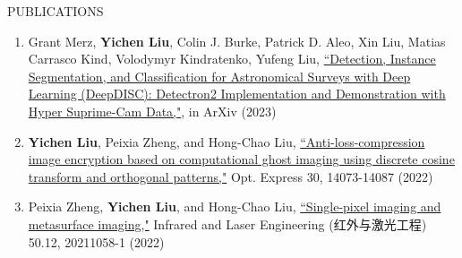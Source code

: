 \documentclass[11pt]{article}
\begin{document}
\begin{section}{PUBLICATIONS}
    
\begin{enumerate}[leftmargin=1.5em]
    \item Grant Merz, \textbf{Yichen Liu}, Colin J. Burke, Patrick D. Aleo, Xin Liu, Matias Carrasco Kind, Volodymyr Kindratenko, Yufeng Liu, \href{https://arxiv.org/abs/2307.05826}{``Detection, Instance Segmentation, and Classification for Astronomical Surveys with Deep Learning (DeepDISC): Detectron2 Implementation and Demonstration with Hyper Suprime-Cam Data,"}, in ArXiv (2023)
    \item \textbf{Yichen Liu}, Peixia Zheng, and Hong-Chao Liu, \href{https://opg.optica.org/oe/fulltext.cfm?uri=oe-30-9-14073&id=471300}{``Anti-loss-compression image encryption based on computational ghost imaging using discrete cosine transform and orthogonal patterns,"} Opt. Express 30, 14073-14087 (2022)
    \item Peixia Zheng, \textbf{Yichen Liu}, and Hong-Chao Liu, \href{http://www.irla.cn/cn/article/doi/10.3788/IRLA20211058}{``Single-pixel imaging and metasurface imaging,"} Infrared and Laser Engineering (红外与激光工程) 50.12, 20211058-1 (2022)
\end{enumerate}

\end{section}
\end{document}
